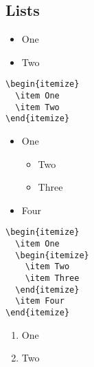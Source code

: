 \documentclass[a4paper,11pt,fleqn]{book}
\begin{document}
\begin{enumerate}
\subsection{Lists}
\begin{multicols}{2}
  \begin{itemize}
    \item One
    \item Two
  \end{itemize}

  \vfill\null\columnbreak

  \begin{verbatim}
\begin{itemize}
  \item One
  \item Two
\end{itemize}
   \end{verbatim}
\end{multicols}

\begin{multicols}{2}
  \begin{itemize}
    \item One
    \begin{itemize}
      \item Two
      \item Three
    \end{itemize}
    \item Four
  \end{itemize}

  \vfill\null\columnbreak

  \begin{verbatim}
\begin{itemize}
  \item One
  \begin{itemize}
    \item Two
    \item Three
  \end{itemize}
  \item Four
\end{itemize}
  \end{verbatim}
\end{multicols}

\begin{multicols}{2}
  \begin{enumerate}
    \item One
    \item Two
  \end{enumerate}


\end{multicols}
\end{enumerate}
\end{document}
